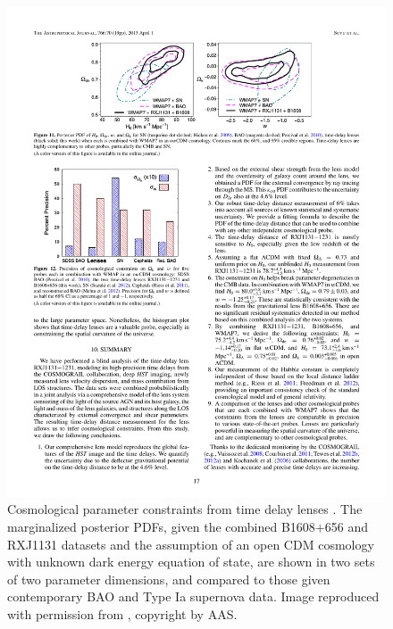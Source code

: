 \begin{figure}[!ht]
\centering\includegraphics[width=0.9\linewidth]{figures/Suyu13_fig11.pdf}
\caption{Cosmological parameter constraints from time delay
lenses \citep{Suy++13}. The marginalized posterior PDFs, given the combined B1608$+$656
and RXJ1131 datasets and the assumption of an open CDM cosmology with
unknown dark energy equation of state, are shown in
two sets of two parameter dimensions,
and compared to those given contemporary BAO and Type Ia supernova data.
Image reproduced with permission from \citet{Suy++13}, copyright by AAS.}
\label{fig:current-constraints}
\end{figure}

